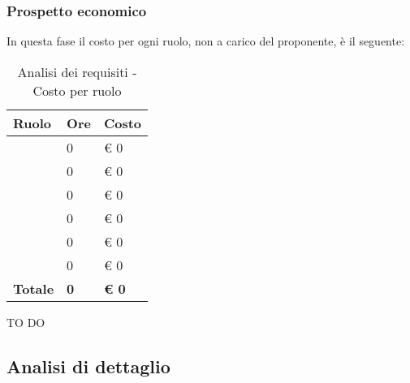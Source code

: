 		\subsubsection{Prospetto economico} %
		\label{ssub:prospetto_economico}
		In questa fase il costo per ogni ruolo, non a carico del proponente, è il seguente: \\
			\begin{table}[!h]
				\begin{center}
					\begin{tabularx}{0.6\textwidth}{|l|l|X|}
						\hline
						\textbf{Ruolo} & \textbf{Ore} & \textbf{Costo} \\
						\hline
						\roleProjectManager & 0 & \euro{} 0 \\
						\hline
						\roleAnalyst & 0 & \euro{} 0 \\
						\hline
						\roleDesigner & 0 & \euro{} 0 \\
						\hline
						\roleAdministrator & 0 & \euro{} 0 \\
						\hline
						\roleProgrammer & 0 & \euro{} 0 \\
						\hline
						\roleVerifier & 0 & \euro{} 0 \\
						\hline
						\textbf{Totale} & \textbf{0} & \textbf{\euro{} 0} \\
						\hline
					\end{tabularx}
				\end{center}
			\caption{Analisi dei requisiti - Costo per ruolo}
			\end{table}
			
		\noindent
		TO DO
		
	
	\subsection{Analisi di dettaglio} %
	\label{sub:analisi_di_dettaglio}
